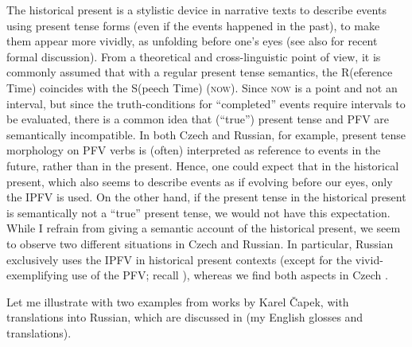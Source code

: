 \documentclass[output=paper,colorlinks,citecolor=brown]{langscibook}
\begin{document}
The historical present is a stylistic device in narrative texts to describe events using present tense forms (even if the events happened in the past), to make them appear more vividly, as unfolding before one's eyes (see also \citealt{anandtoo} for recent formal discussion). From a theoretical and cross-linguistic point of view, it is commonly assumed that with a regular present tense semantics, the R(eference Time) coincides with the S(peech Time) (\textsc{now}). Since  \textsc{now} is a point and not an interval, but since the truth-conditions for ``completed'' events require intervals to be evaluated, there is a common idea that (``true'') present tense and PFV are semantically incompatible. In both Czech and Russian, for example, present tense morphology on PFV verbs is (often) interpreted as reference to events in the future, rather than in the present. Hence, one could expect that in the historical present, which also seems to describe events as if evolving before our eyes, only the IPFV is used. On the other hand, if the present tense in the historical present is semantically not a ``true'' present tense, %
we would not have this expectation. While I refrain from giving a semantic account of the historical present, we seem to observe two different situations in Czech and Russian. In particular, Russian exclusively uses the IPFV in historical present contexts (except for the vivid-exemplifying use of the PFV; recall ), whereas we find both aspects in Czech \citep{krizkova55,%
bondarko59,petruxina83,stunova93,%
Dickey2000,fortuin2015typology}.  

\iffalse 

Let me illustrate with two examples from works by Karel Čapek, with translations into Russian, which are discussed in \citet{stunova93} (my English glosses and translations).
\end{document}
